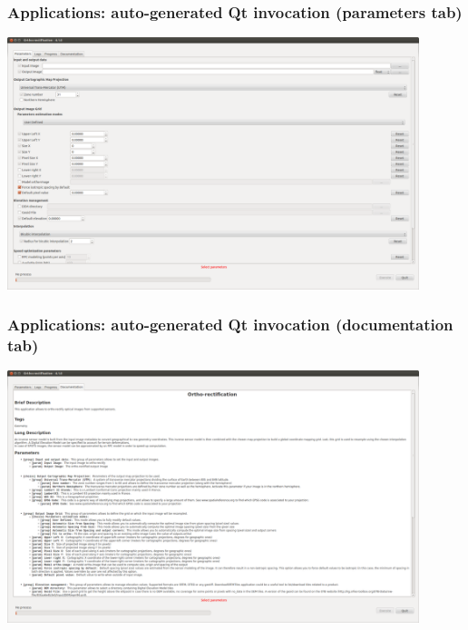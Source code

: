 \documentclass[8pt]{beamer}
\begin{document}
\begin{frame}[fragile]
\frametitle{Applications: auto-generated Qt invocation (parameters tab)}
\begin{center}
\includegraphics[width=0.9\textwidth]{images/app_parameters.png}
\end{center}
\end{frame}


\begin{frame}[fragile]
\frametitle{Applications: auto-generated Qt invocation (documentation tab)}
\begin{center}
\includegraphics[width=0.9\textwidth]{images/app_doc.png}
\end{center}
\end{frame}
\end{document}
